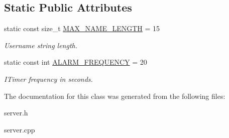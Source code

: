 \subsection*{Static Public Attributes}
\begin{DoxyCompactItemize}
\item 
\hypertarget{classrpie_1_1server_a1173d2e4cbb1f0d6c91f04766bdc0802}{static const size\-\_\-t \hyperlink{classrpie_1_1server_a1173d2e4cbb1f0d6c91f04766bdc0802}{M\-A\-X\-\_\-\-N\-A\-M\-E\-\_\-\-L\-E\-N\-G\-T\-H} = 15}\label{classrpie_1_1server_a1173d2e4cbb1f0d6c91f04766bdc0802}

\begin{DoxyCompactList}\small\item\em Username string length. \end{DoxyCompactList}\item 
\hypertarget{classrpie_1_1server_a3dec19e76bb1aeb96cbd4b6286cd9286}{static const int \hyperlink{classrpie_1_1server_a3dec19e76bb1aeb96cbd4b6286cd9286}{A\-L\-A\-R\-M\-\_\-\-F\-R\-E\-Q\-U\-E\-N\-C\-Y} = 20}\label{classrpie_1_1server_a3dec19e76bb1aeb96cbd4b6286cd9286}

\begin{DoxyCompactList}\small\item\em I\-Timer frequency in seconds. \end{DoxyCompactList}\end{DoxyCompactItemize}


The documentation for this class was generated from the following files\-:\begin{DoxyCompactItemize}
\item 
server.\-h\item 
server.\-cpp\end{DoxyCompactItemize}
